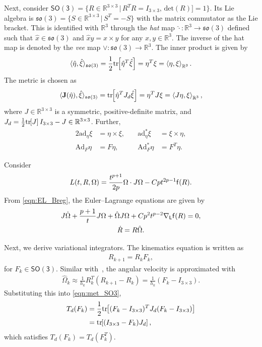 \documentclass[letterpaper, 10pt, conference]{ieeeconf}
\newcommand{\bracket}[1]{\ensuremath{\left[ #1 \right]}}
\newcommand{\tr}[1]{\mbox{tr}\ensuremath{\negthickspace\bracket{#1}}}
\newcommand{\SO}{\ensuremath{\mathsf{SO(3)}}}
\renewcommand{\L}{\ensuremath{\mathsf{L}}}
\newcommand{\so}{\ensuremath{\mathfrak{so}(3)}}
\renewcommand{\Re}{\ensuremath{\mathbb{R}}}
\newcommand{\pair}[1]{\ensuremath{\left\langle #1 \right\rangle}}
\newcommand{\Ad}{\ensuremath{\mathrm{Ad}}}
\newcommand{\ad}{\ensuremath{\mathrm{ad}}}
\begin{document}
Next, consider $\SO=\{R\in\Re^{3\times 3}\,|\, R^T R = I_{3\times 3},\, \mathrm{det}(R)]=1\}$.
Its Lie algebra is $\so=\{S\in\Re^{3\times 3}\,|\, S^T=-S\}$ with the matrix commutator as the Lie bracket. 
This is identified with $\Re^3$ through the \textit{hat} map $\hat\cdot :\Re^3\rightarrow\so$ defined such that $\hat x\in\so$ and $\hat x y = x\times y$ for any $x,y\in\Re^3$.
The inverse of the hat map is denoted by the \textit{vee} map $\vee: \so\rightarrow\Re^3$.
The inner product is given by
\begin{align*}
    \langle \hat \eta, \hat \xi \rangle_{\so} = \frac{1}{2}\tr{\hat \eta^T\hat \xi} = \eta^T\xi = \pair{\eta,\xi}_{\Re^3}.
\end{align*}
The metric is chosen as
\begin{align}
    \langle \mathbf{J}(\hat \eta), \hat \xi \rangle_{\so} = \tr{\hat \eta^T J_d \hat \xi} = \eta^TJ \xi = \pair{J\eta,\xi}_{\Re^3},\label{eqn:met_SO3}
\end{align}
where $J\in\Re^{3\times 3}$ is a symmetric, positive-definite matrix, and $J_d=\frac{1}{2}\tr{J}I_{3\times 3}-J\in\Re^{3\times 3}$.
Further, 
\begin{alignat*}{2}
    \ad_\eta\xi &= \eta\times \xi,& \quad \ad^*_\eta \xi &= \xi\times \eta,\\
    \Ad_F\eta &= F\eta,& \quad \Ad^*_F \eta &= F^T\eta.
\end{alignat*}

Consider
\begin{align*}
    L(t,R,\Omega) = \frac{t^{p+1}}{2p} \Omega\cdot J\Omega - Cpt^{2p-1} \mathsf{f}(R).
\end{align*}
From \eqref{eqn:EL_Breg}, the Euler--Lagrange equations are given by
\begin{gather}
    J\dot\Omega + \frac{p+1}{t} J\Omega + \hat\Omega J\Omega + C p^2 t^{p-2} \nabla_\L \obj(R) = 0,\label{eqn:EL_SO3}\\
    \dot R = R\hat\Omega. \label{eqn:R_dot}
\end{gather}

Next, we derive variational integrators. 
The kinematics equation is written as
\begin{align}
    R_{k+1} = R_k F_k, \label{eqn:Rkp}
\end{align}
for $F_k\in\SO$.
Similar with~\cite{LeeLeoCMAME07}, the angular velocity is approximated with
\begin{align*}
    \hat\Omega_k \approx \frac{1}{h_k} R_k^T (R_{k+1}-R_k) = \frac{1}{h_k} (F_k-I_{3\times 3}).
\end{align*}
Substituting this into \eqref{eqn:met_SO3},
\begin{align}
    T_d(F_k) & = \frac{1}{2}\tr{(F_k-I_{3\times 3})^T J_d(F_k-I_{3\times 3})}\nonumber \\
             & =\tr{(I_{3\times 3}-F_k)J_d}, \label{eqn:Td_SO3}
\end{align}
which satisfies $T_d(F_k)=T_d(F_k^T)$.
\end{document}
